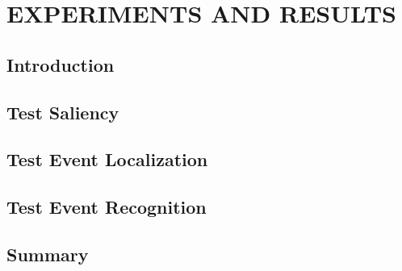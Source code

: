 \chapter{EXPERIMENTS AND RESULTS}
\section{Introduction}
\section{Test Saliency}
\section{Test Event Localization}
\section{Test Event Recognition} 
\section{Summary}